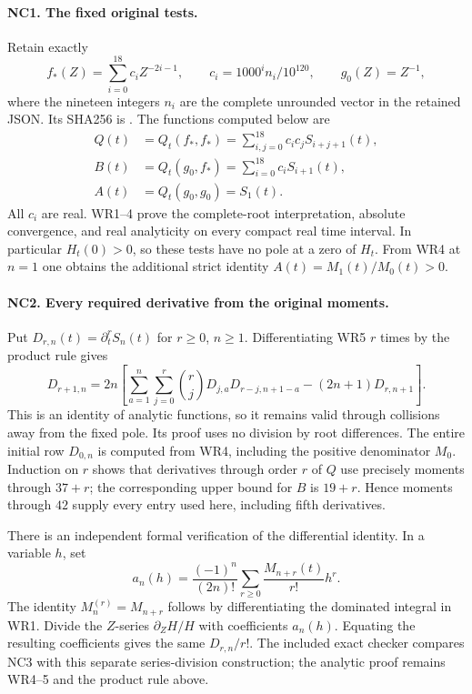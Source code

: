 \documentclass[11pt,a4paper]{article}
\theoremstyle{definition}\newtheorem{definition}[theorem]{Definition}
\begin{document}
\paragraph{NC1. The fixed original tests.}
Retain exactly
\[
 f_*(Z)=\sum_{i=0}^{18}c_i Z^{-2i-1},\qquad
 c_i=1000^i n_i/10^{120},\qquad g_0(Z)=Z^{-1},
 \tag{NC1}
\]
where the nineteen integers $n_i$ are the complete unrounded vector
in the retained JSON. Its SHA256 is
.
The functions computed below are
\[
 \begin{split}
 Q(t)&=Q_t(f_*,f_*)=\sum_{i,j=0}^{18}c_ic_j S_{i+j+1}(t),\\
 B(t)&=Q_t(g_0,f_*)=\sum_{i=0}^{18}c_i S_{i+1}(t),\\
 A(t)&=Q_t(g_0,g_0)=S_1(t).
 \end{split}\tag{NC2}
\]
All $c_i$ are real. WR1--4 prove the complete-root interpretation,
absolute convergence, and real analyticity on every compact real
time interval. In particular $H_t(0)>0$, so these tests have no pole
at a zero of $H_t$. From WR4 at $n=1$ one obtains the additional
strict identity $A(t)=M_1(t)/M_0(t)>0$.

\paragraph{NC2. Every required derivative from the original moments.}
Put $D_{r,n}(t)=\partial_t^r S_n(t)$ for $r\ge0$, $n\ge1$.
Differentiating WR5 $r$ times by the product rule gives
\[
 D_{r+1,n}=2n\left[
 \sum_{a=1}^n\sum_{j=0}^r\binom rj
 D_{j,a}D_{r-j,n+1-a}-(2n+1)D_{r,n+1}\right].
 \tag{NC3}
\]
This is an identity of analytic functions, so it remains valid
through collisions away from the fixed pole. Its proof uses no
division by root differences. The entire initial row $D_{0,n}$
is computed from WR4, including the positive denominator $M_0$.
Induction on $r$ shows that derivatives through order $r$ of $Q$
use precisely moments through $37+r$; the corresponding upper
bound for $B$ is $19+r$. Hence moments through $42$ supply every
entry used here, including fifth derivatives.

There is an independent formal verification of the differential
identity. In a variable $h$, set
\[
 a_n(h)=\frac{(-1)^n}{(2n)!}
       \sum_{r\ge0}\frac{M_{n+r}(t)}{r!}h^r.
 \tag{NC4}
\]
The identity $M_n^{(r)}=M_{n+r}$ follows by differentiating the
dominated integral in WR1. Divide the $Z$-series $\partial_ZH/H$
with coefficients $a_n(h)$. Equating the resulting coefficients
gives the same $D_{r,n}/r!$. The included exact checker compares
NC3 with this separate series-division construction; the analytic
proof remains WR4--5 and the product rule above.
\end{document}
